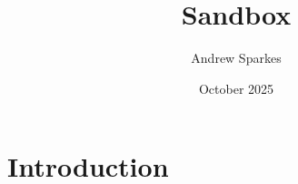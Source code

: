 \documentclass{article}
\title{Sandbox}
\author{Andrew Sparkes}
\date{October 2025}
\begin{document}
\maketitle


\section{Introduction}







\end{document}
